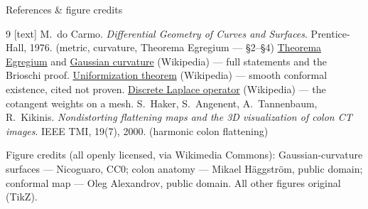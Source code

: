 \documentclass[aspectratio=169,10pt]{beamer}
\begin{document}
\begin{frame}{References \& figure credits}
  \footnotesize
  \begin{thebibliography}{9}
    [text]
     M.~do Carmo. \emph{Differential Geometry of Curves and Surfaces}. Prentice-Hall, 1976. (metric, curvature, Theorema Egregium --- \S2--\S4)
     \href{https://en.wikipedia.org/wiki/Theorema_Egregium}{Theorema Egregium} and \href{https://en.wikipedia.org/wiki/Gaussian_curvature}{Gaussian curvature} (Wikipedia) --- full statements and the Brioschi proof.
     \href{https://en.wikipedia.org/wiki/Uniformization_theorem}{Uniformization theorem} (Wikipedia) --- smooth conformal existence, cited not proven.
     \href{https://en.wikipedia.org/wiki/Discrete_Laplace_operator}{Discrete Laplace operator} (Wikipedia) --- the cotangent weights on a mesh.
     S.~Haker, S.~Angenent, A.~Tannenbaum, R.~Kikinis. \emph{Nondistorting flattening maps and the 3D visualization of colon CT images}. IEEE TMI, 19(7), 2000. (harmonic colon flattening)
  \end{thebibliography}
  \smallskip
  {\scriptsize Figure credits (all openly licensed, via Wikimedia Commons): Gaussian-curvature surfaces --- Nicoguaro, CC0; colon anatomy --- Mikael Häggström, public domain; conformal map --- Oleg Alexandrov, public domain. All other figures original (TikZ).}
\end{frame}
\end{document}
